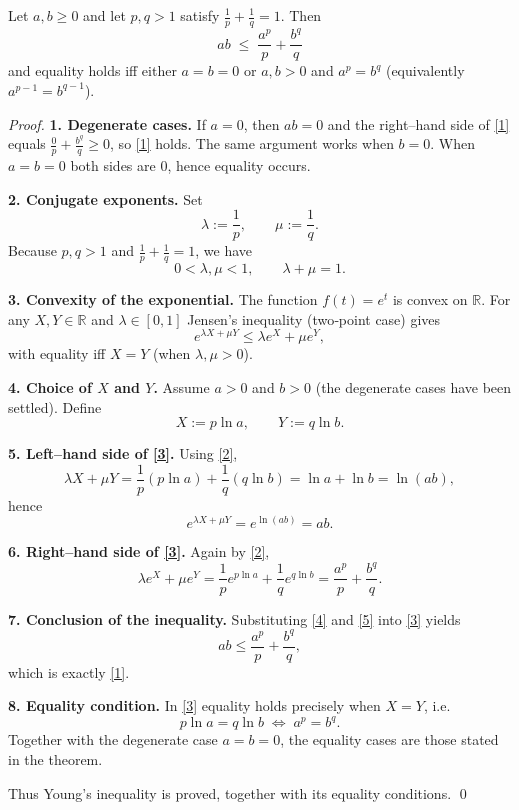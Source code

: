 \begin{theorem}
Let $a,b\ge 0$ and let $p,q>1$ satisfy $\displaystyle\frac1p+\frac1q=1$. Then
\[
ab\;\le\;\frac{a^{p}}{p}+\frac{b^{q}}{q}\tag{1}
\]
and equality holds iff either $a=b=0$ or $a,b>0$ and $a^{p}=b^{q}$ (equivalently $a^{p-1}=b^{q-1}$).
\end{theorem}

\begin{proof}
\textbf{1. Degenerate cases.}  
If $a=0$, then $ab=0$ and the right–hand side of \eqref{1} equals $\frac{0}{p}+\frac{b^{q}}{q}\ge0$, so \eqref{1} holds.  
The same argument works when $b=0$.  
When $a=b=0$ both sides are $0$, hence equality occurs.

\medskip\noindent\textbf{2. Conjugate exponents.}  
Set
\[
\lambda:=\frac1p,\qquad \mu:=\frac1q .
\]
Because $p,q>1$ and $\frac1p+\frac1q=1$, we have
\[
0<\lambda,\mu<1,\qquad \lambda+\mu=1.\tag{2}
\]

\medskip\noindent\textbf{3. Convexity of the exponential.}  
The function $f(t)=e^{t}$ is convex on $\mathbb R$.  For any $X,Y\in\mathbb R$ and $\lambda\in[0,1]$ Jensen’s inequality (two‑point case) gives
\begin{equation}
e^{\lambda X+\mu Y}\le \lambda e^{X}+\mu e^{Y},\tag{3}
\end{equation}
with equality iff $X=Y$ (when $\lambda,\mu>0$).

\medskip\noindent\textbf{4. Choice of $X$ and $Y$.}  
Assume $a>0$ and $b>0$ (the degenerate cases have been settled).  Define
\[
X:=p\ln a,\qquad Y:=q\ln b .
\]

\medskip\noindent\textbf{5. Left–hand side of \eqref{3}.}  
Using \eqref{2},
\[
\lambda X+\mu Y
 =\frac1p(p\ln a)+\frac1q(q\ln b)
 =\ln a+\ln b
 =\ln(ab),
\]
hence
\[
e^{\lambda X+\mu Y}=e^{\ln(ab)}=ab.\tag{4}
\]

\medskip\noindent\textbf{6. Right–hand side of \eqref{3}.}  
Again by \eqref{2},
\[
\lambda e^{X}+\mu e^{Y}
 =\frac1p e^{p\ln a}+\frac1q e^{q\ln b}
 =\frac{a^{p}}{p}+\frac{b^{q}}{q}.\tag{5}
\]

\medskip\noindent\textbf{7. Conclusion of the inequality.}  
Substituting \eqref{4} and \eqref{5} into \eqref{3} yields
\[
ab\le\frac{a^{p}}{p}+\frac{b^{q}}{q},
\]
which is exactly \eqref{1}.

\medskip\noindent\textbf{8. Equality condition.}  
In \eqref{3} equality holds precisely when $X=Y$, i.e.
\[
p\ln a = q\ln b \;\Longleftrightarrow\; a^{p}=b^{q}.
\]
Together with the degenerate case $a=b=0$, the equality cases are those stated in the theorem.

Thus Young’s inequality is proved, together with its equality conditions. \qed
\end{proof}